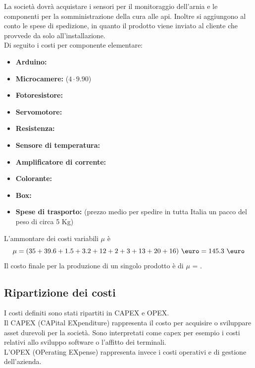 La società dovrà acquistare i sensori per il monitoraggio dell’arnia e le
componenti per la somministrazione della cura alle api. Inoltre si aggiungono al
conto le spese di spedizione, in quanto il prodotto viene inviato al cliente che
provvede da solo all’installazione.\\
%
Di seguito i costi per componente elementare:
\begin{itemize}
\item \textbf{Arduino: }
\item \textbf{Microcamere: } ($4 \cdot 9.90$\EUR{})
\item \textbf{Fotoresistore: }
\item \textbf{Servomotore: }
\item \textbf{Resistenza: }
\item \textbf{Sensore di temperatura: }
\item \textbf{Amplificatore di corrente: }
\item \textbf{Colorante: }
\item \textbf{Box: }
\item \textbf{Spese di trasporto: } (prezzo medio per spedire in tutta
Italia un pacco del peso di circa 5 Kg)
\end{itemize}
L’ammontare dei costi variabili $\mu$ è
\begin{displaymath}
\mu= (35 + 39.6 + 1.5 + 3.2 + 12 + 2 + 3 + 13  + 20 + 16) \ \mbox{\euro} = 145.3
\ \mbox{\euro}
\end{displaymath}
Il costo finale per la produzione di un singolo prodotto è di $\mu$ = .
\subsection{Ripartizione dei costi}
I costi definiti sono stati ripartiti in CAPEX e OPEX.\\
Il CAPEX (CAPital EXpenditure) rappresenta il costo per acquisire o sviluppare
asset durevoli per la società. Sono interpretati come capex per esempio i costi
relativi allo sviluppo software o l’affitto dei terminali.\\
L’OPEX (OPerating EXpense) rappresenta invece i costi operativi e di gestione
dell’azienda.

